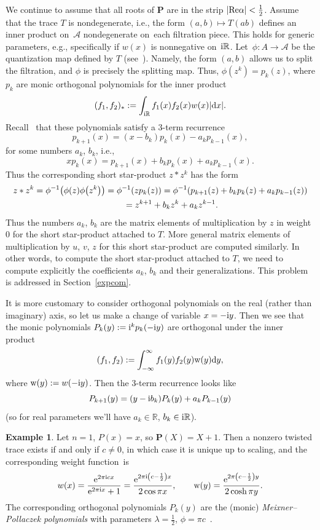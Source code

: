 \documentclass[pdftex]{sigma}
\newcommand{\mc}[1]{\mathcal{#1}}
\theoremstyle{definition}
\newtheorem{Example}[Theorem]{Example}
\numberwithin{equation}{section}
\begin{document}
We continue to assume that all roots of $\mathbf{P}$ are in the strip $|{\rm Re}\alpha|<\frac{1}{2}$. Assume that the trace $T$ is nondegenerate, i.e., the form $(a,b)\mapsto T(ab)$ defines an inner product on~$\mc A$ nondegenerate on~each filtration piece.
This holds for generic parameters, e.g., specifically if $w(x)$ is nonnegative on~${\rm i}\mathbb R$. Let~$\phi\colon A\to \mc A$ be the quantization map defined by $T$
(see~\cite[Section~3]{ES}). Namely, the form $(a,b)$ allows us to split the filtration, and $\phi$ is precisely the splitting map. Thus, $\phi(z^k)=p_k(z)$, where
$p_k$ are monic orthogonal polynomials
for the inner product
\[
(f_1,f_2)_*:=\int_{{\rm i}\mathbb R}f_1(x)f_2(x)w(x)|{\rm d}x|.
\]
Recall~\cite{Sz} that these polynomials satisfy a 3-term recurrence
\[
p_{k+1}(x)=(x-b_k)p_k(x)-a_kp_{k-1}(x),
\]
for some numbers $a_k$, $b_k$, i.e.,
\[
xp_{k}(x)=p_{k+1}(x)+b_kp_k(x)+a_kp_{k-1}(x).
\]
Thus the corresponding short star-product $z*z^k$
has the form
\begin{gather*}
z*z^k=\phi^{-1}\big(\phi(z)\phi\big(z^k\big)\big)=\phi^{-1}(zp_k(z))=
\phi^{-1}(p_{k+1}(z)+b_kp_k(z)+a_kp_{k-1}(z))
\\ \hphantom{z*z^k}
{}=z^{k+1}+b_kz^k+a_kz^{k-1}.
\end{gather*}
Thus the numbers $a_k$, $b_k$ are the matrix elements of multiplication by $z$ in weight $0$ for the short star-product attached to $T$. More general matrix elements of multiplication by $u$, $v$, $z$ for this short star-product are computed similarly. In other words, to compute the short star-product attached to $T$, we need to compute explicitly the coefficients $a_k$, $b_k$ and their generalizations. This problem
is addressed in Section~\ref{expcom}.

It is more customary to consider orthogonal polynomials on the real (rather than imaginary) axis, so let us make a change of variable $x=-{\rm i}y$.
Then we see that the monic polynomials $P_k(y):={\rm i}^{k}p_k(-{\rm i}y)$
are orthogonal under the inner product
\[
(f_1,f_2):=\int_{-\infty}^\infty f_1(y)f_2(y){\rm w}(y){\rm d}y,
\]
where ${\rm w}(y):=w(-{\rm i}y)$. Then the 3-term recurrence looks like
\[
P_{k+1}(y)=(y-{\rm i}b_k)P_k(y)+a_kP_{k-1}(y)
\]
(so for real parameters we'll have $a_k\in \mathbb R$, $b_k\in {\rm i}\mathbb R$).

\begin{Example}\label{n=1}
Let $n=1$, $P(x)=x$, so $\mathbf{P}(X)=X+1$.
Then a nonzero twisted trace exists if and only if $c\ne 0$, in which case it is unique up to scaling, and the corresponding weight func\-tion~is
\[
w(x)=\frac{{\rm e}^{2\pi {\rm i}cx}}{{\rm e}^{2\pi {\rm i}x}+1}
=\frac{{\rm e}^{2\pi {\rm i}\left(c-\frac{1}{2}\right)x}}{2\cos \pi x},\qquad
{\rm w}(y)=\frac{{\rm e}^{2\pi\left(c-\frac{1}{2}\right)y}}{2\cosh \pi y}.
\]
The corresponding orthogonal polynomials $P_k(y)$ are the (monic) {\it Meixner--Pollaczek polynomials} with parameters $\lambda=\frac{1}{2}$, $\phi=\pi c$~\cite[Section~1.7]{KS}.
\end{Example}
\end{document}
